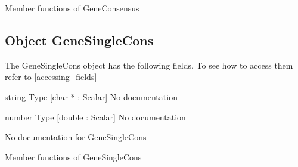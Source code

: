 Member functions of GeneConsensus

\subsection{Object GeneSingleCons}

\label{object_GeneSingleCons}

The GeneSingleCons object has the following fields. To see how to access them refer to \ref{accessing_fields}
\begin{description}
\item{string} Type [char * : Scalar] No documentation

\item{number} Type [double : Scalar] No documentation

\end{description}
No documentation for GeneSingleCons

Member functions of GeneSingleCons

